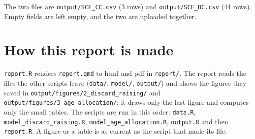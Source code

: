 \documentclass[
  a4paper,
  DIV=11,
  numbers=noendperiod]{scrartcl}
\begin{document}
The two files are \texttt{output/SCF\_CC.csv} (3 rows) and
\texttt{output/SCF\_DC.csv} (44 rows). Empty fields are left empty, and
the two are uploaded together.

\section{How this report is made}\label{how-this-report-is-made}

\texttt{report.R} renders \texttt{report.qmd} to html and pdf in
\texttt{report/}. The report reads the files the other scripts leave
(\texttt{data/}, \texttt{model/}, \texttt{output/}) and shows the
figures they saved in \texttt{output/figures/2\_discard\_raising/} and
\texttt{output/figures/3\_age\_allocation/}; it draws only the last
figure and computes only the small tables. The scripts are run in this
order: \texttt{data.R}, \texttt{model\_discard\_raising.R},
\texttt{model\_age\_allocation.R}, \texttt{output.R} and then
\texttt{report.R}. A figure or a table is as current as the script that
made its file.
\end{document}
